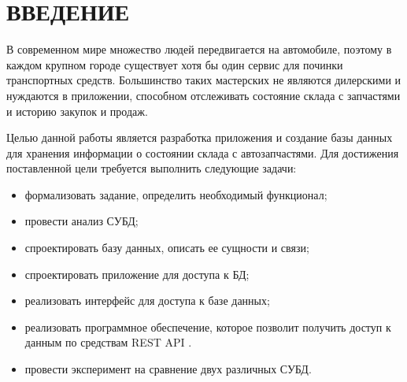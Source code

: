 \chapter*{ВВЕДЕНИЕ}

В современном мире множество людей передвигается на автомобиле, поэтому в каждом крупном городе существует хотя бы один сервис для починки транспортных средств. Большинство таких мастерских не являются дилерскими и нуждаются в приложении, способном отслеживать состояние склада с запчастями и историю закупок и продаж.

Целью данной работы является разработка приложения и создание базы данных для хранения информации о состоянии склада с автозапчастями. Для достижения поставленной цели требуется выполнить следующие задачи:
\begin{itemize}
	\item формализовать задание, определить необходимый функционал;
	\item провести анализ СУБД; 
	\item спроектировать базу данных, описать ее сущности и связи;
	\item спроектировать приложение для доступа к БД;
	\item реализовать интерфейс для доступа к базе данных;
	\item реализовать программное обеспечение, которое позволит получить доступ к данным по средствам REST API \cite{rest-api}.
	\item провести эксперимент на сравнение двух различных СУБД.
\end{itemize}
